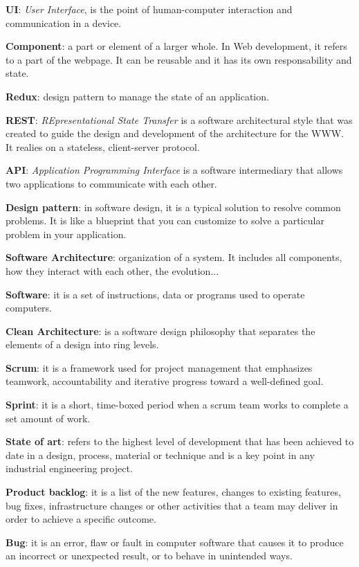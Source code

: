 \textbf{UI}: \textit{User Interface}, is the point of human-computer interaction and communication in a device.
\bigskip

\textbf{Component}: a part or element of a larger whole. In Web development, it refers to a part of the webpage. It can be reusable and it has its own responsability and state.
\bigskip

\textbf{Redux}: design pattern to manage the state of an application. 
\bigskip

\textbf{REST}: \textit{REpresentational State Transfer} is a software architectural style that was created to guide the design and development of the architecture for the WWW. It realies on a stateless, client-server protocol.
\bigskip

\textbf{API}: \textit{Application Programming Interface} is a software intermediary that allows two applications to communicate with each other.
\bigskip

\textbf{Design pattern}: in software design, it is a typical solution to resolve common problems. It is like a blueprint that you can customize to solve a particular problem in your application.
\bigskip

\textbf{Software Architecture}: organization of a system. It includes all components, how they interact with each other, the evolution...
\bigskip

\textbf{Software}: it is a set of instructions, data or programs used to operate computers.
\bigskip

\textbf{Clean Architecture}: is a software design philosophy that separates the elements of a design into ring levels.
\bigskip

\textbf{Scrum}: it is a framework used for project management that emphasizes teamwork, accountability and iterative progress toward a well-defined goal.
\bigskip

\textbf{Sprint}: it is a short, time-boxed period when a scrum team works to complete a set amount of work.
\bigskip

\textbf{State of art}: refers to the highest level of development that has been achieved to date in a design, process, material or technique and is a key point in any industrial engineering project.
\bigskip

\textbf{Product backlog}: it is a list of the new features, changes to existing features, bug fixes, infrastructure changes or other activities that a team may deliver in order to achieve a specific outcome. 
\bigskip

\textbf{Bug}: it is an error, flaw or fault in computer software that causes it to produce an incorrect or unexpected result, or to behave in unintended ways.
\bigskip

